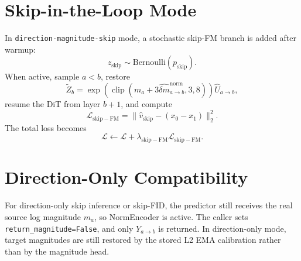 \documentclass[11pt]{article}
\begin{document}
\section{Skip-in-the-Loop Mode}
In \texttt{direction-magnitude-skip} mode, a stochastic skip-FM branch is added
after warmup:
\[
    z_{\mathrm{skip}}\sim\mathrm{Bernoulli}(p_{\mathrm{skip}}).
\]
When active, sample \(a<b\), restore
\[
    \tilde Z_b
    =
    \exp\left(
    \operatorname{clip}
    (m_a+3\hat{\delta m}_{a\rightarrow b}^{\mathrm{norm}},3,8)
    \right)
    \hat U_{a\rightarrow b},
\]
resume the DiT from layer \(b+1\), and compute
\[
    \mathcal{L}_{\mathrm{skip-FM}}
    =
    \|\hat v_{\mathrm{skip}}-(x_0-x_1)\|_2^2.
\]
The total loss becomes
\[
    \mathcal{L}
    \leftarrow
    \mathcal{L}
    +\lambda_{\mathrm{skip-FM}}\mathcal{L}_{\mathrm{skip-FM}}.
\]

\section{Direction-Only Compatibility}
For direction-only skip inference or skip-FID, the predictor still receives
the real source log magnitude \(m_a\), so NormEncoder is active. The caller
sets \texttt{return\_magnitude=False}, and only \(Y_{a\rightarrow b}\) is
returned. In direction-only mode, target magnitudes are still restored by the
stored L2 EMA calibration rather than by the magnitude head.
\end{document}
